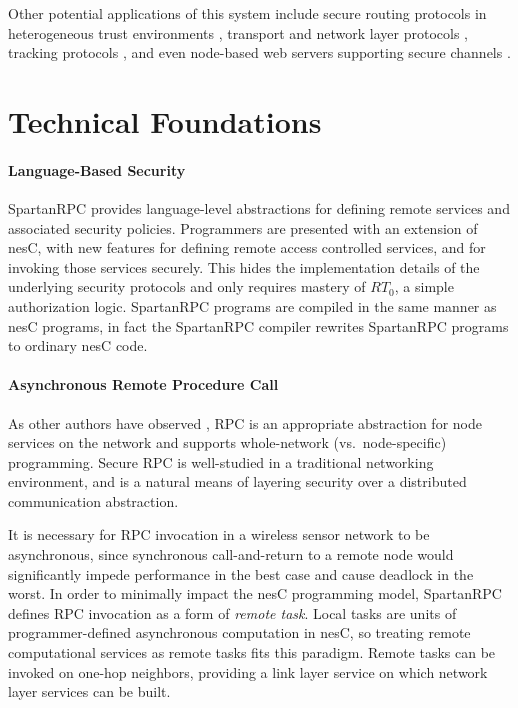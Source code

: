Other potential applications of this system include secure routing protocols in heterogeneous
trust environments \cite{senroute-ahnj03}, transport and network layer protocols
\cite{perillo-heinzelman-2005}, tracking protocols \cite{brooks-ramanathan-sayeed-2003}, and
even node-based web servers supporting secure channels \cite{1049776}.

\section{Technical Foundations}

\paragraph{Language-Based Security} SpartanRPC provides language-level abstractions for defining
remote services and associated security policies. Programmers are presented with an extension of
nesC, with new features for defining remote access controlled services, and for invoking those
services securely. This hides the implementation details of the underlying security protocols
and only requires mastery of $RT_0$, a simple authorization logic. SpartanRPC programs are
compiled in the same manner as nesC programs, in fact the SpartanRPC compiler rewrites
SpartanRPC programs to ordinary nesC code.

\paragraph{Asynchronous Remote Procedure Call} As other authors have observed
\cite{may-tinyrpc-2007}, RPC is an appropriate abstraction for node services on the network and
supports whole-network (vs.~node-specific) programming. Secure RPC is well-studied in a
traditional networking environment, and is a natural means of layering security over a
distributed communication abstraction.

It is necessary for RPC invocation in a wireless sensor network to be asynchronous, since
synchronous call-and-return to a remote node would significantly impede performance in the best
case and cause deadlock in the worst. In order to minimally impact the nesC programming model,
SpartanRPC defines RPC invocation as a form of \emph{remote task}. Local tasks are units of
programmer-defined asynchronous computation in nesC, so treating remote computational services
as remote tasks fits this paradigm. Remote tasks can be invoked on one-hop neighbors, providing
a link layer service on which network layer services can be built.

